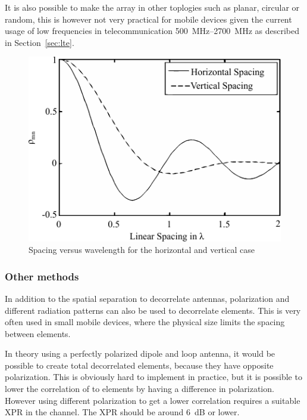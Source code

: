 It is also possible to make the array in other toplogies such as planar, circular or random, this is however not very practical for mobile devices given the current usage of low frequencies in telecommunication \SIrange{500}{2700}{MHz} as described in Section~\ref{sec:lte}.

\begin{figure}[htbp]
  \centering
  \includegraphics[scale=1.2]{img/analysis/mimoSpacing}
  \caption{Spacing versus wavelength for the horizontal and vertical case\cite{Tim2012Practical}}
  \label{fig:mimo-spacing}
\end{figure}

\subsubsection{Other methods} %
In addition to the spatial separation to decorrelate antennas, polarization and different radiation patterns can also be used to decorrelate elements. This is very often used in small mobile devices, where the physical size limits the spacing between elements.  

In theory using a perfectly polarized dipole and loop antenna, it would be possible to create total decorrelated elements, because they have opposite polarization. This is obviously hard to implement in practice, but it is possible to lower the correlation of to elements by having a difference in polarization. However using different polarization to get a lower correlation requires a suitable XPR in the channel. The XPR should be around \SI{6}{dB} or lower\cite{Tim2012Practical}. 
